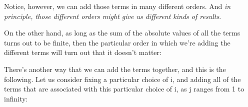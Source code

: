 \documentclass[pdftex, brazil, 12pt, twoside]{article}
\begin{document}
Notice, however, we can add those terms in
many different orders.
And \emph{in principle, those different orders might give us
different kinds of results}.

On the other hand, as long as the sum of the absolute values
of all the terms turns out to be finite, then the particular
order in which we're adding the different terms will turn
out that it doesn't matter:

\begin{figure}[H]
  \begin{center}
  \end{center}
\end{figure}

There's another way that we can add the terms together,
and this is the following.
Let us consider fixing a particular choice of i, and
adding all of the terms that are associated with this
particular choice of i, as j ranges from 1 to infinity:

\begin{figure}[H]
  \begin{center}
  \end{center}
\end{figure}
\end{document}
